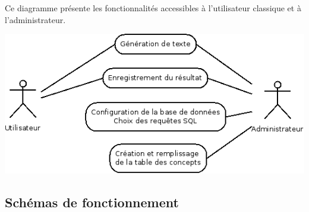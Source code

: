 \documentclass[12pt]{report}
\begin{document}
	Ce diagramme présente les fonctionnalités accessibles à l'utilisateur classique et à l'administrateur.

	\includegraphics[scale=0.8]{Diagramme1.png}

\subsection{Schémas de fonctionnement}
\end{document}
